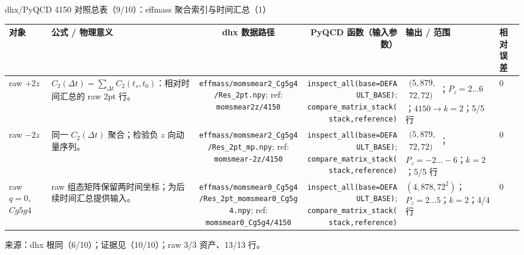 \documentclass[UTF8,aspectratio=169,11pt]{ctexbeamer}
\newcommand{\source}[1]{\vspace{0.04em}\par{\raggedright\fontsize{5.8}{6.6}\selectfont\color{muted}来源：#1\par}}
\newcommand{\codepath}[1]{\nolinkurl{#1}}
\newcommand{\tablehead}{%
  \toprule
  对象 & 公式 / 物理意义 & dhx 数据路径 & PyQCD 函数（输入参数） & 输出 / 范围 & 相对误差 \\
  \midrule}
\begin{document}
\begin{frame}[t]{dhx/PyQCD 4150 对照总表（9/10）：effmass 聚合索引与时间汇总（1）}
  \centering
  \fontsize{7.35}{8.25}\selectfont
  \setlength{\tabcolsep}{2pt}
  \renewcommand{\arraystretch}{1.03}
  \begin{tabularx}{0.98\textwidth}{@{}A B C D E F@{}}
    \tablehead
    raw $+2z$ & $C_2(\Delta t)=\sum_{\Delta t}C_2(t_s,t_0)$：相对时间汇总的 raw 2pt 行。 &
      \codepath{effmass/momsmear2_Cg5g4/Res_2pt.npy};\newline
      ref: \codepath{momsmear2z/4150} &
      \codepath{inspect_all(base=DEFAULT_BASE)};\newline
      \codepath{compare_matrix_stack(stack,reference)} &
      $\begin{gathered}(5,879,\\72,72)\end{gathered}$；$P_z=2\ldots6$；$4150\to k=2$；5/5 行 & $0$ \\
    raw $-2z$ & 同一 $C_2(\Delta t)$ 聚合；检验负 $z$ 向动量序列。 &
      \codepath{effmass/momsmear2_Cg5g4/Res_2pt_mp.npy};\newline
      ref: \codepath{momsmear-2z/4150} &
      \codepath{inspect_all(base=DEFAULT_BASE)};\newline
      \codepath{compare_matrix_stack(stack,reference)} &
      $\begin{gathered}(5,879,\\72,72)\end{gathered}$；$P_z=-2\ldots-6$；$k=2$；5/5 行 & $0$ \\
    raw $q=0$, $Cg5g4$ & raw 组态矩阵保留两时间坐标；为后续时间汇总提供输入。 &
      \codepath{effmass/momsmear0_Cg5g4/Res_2pt_momsmear0_Cg5g4.npy};\newline
      ref: \codepath{momsmear0_Cg5g4/4150} &
      \codepath{inspect_all(base=DEFAULT_BASE)};\newline
      \codepath{compare_matrix_stack(stack,reference)} &
      $(4,878,72^2)$；$P_z=2\ldots5$；$k=2$；4/4 行 & $0$ \\
    \bottomrule
  \end{tabularx}
  \source{dhx 根同（6/10）；证据见（10/10）；raw 3/3 资产、13/13 行。}
\end{frame}
\end{document}
